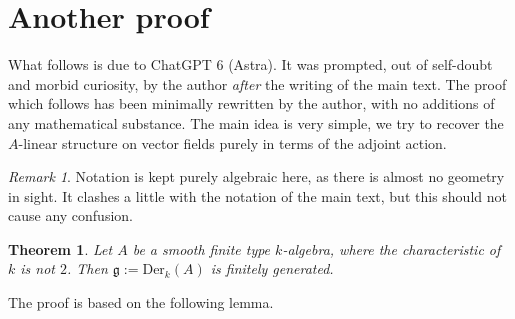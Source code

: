 \documentclass[12pt, oneside]{amsart}       %
\newtheorem{theorem}{Theorem}[section]
\theoremstyle{remark}
\newtheorem*{remark}{Remark}
\newcommand{\g}{\mathfrak{g}}
\begin{document}
\appendix

\section{Another proof}

What follows is due to ChatGPT 6 (Astra). It was prompted, out of self-doubt and morbid curiosity, by the author \emph{after} the writing of the main text. The proof which follows has been minimally rewritten by the author, with no additions of any mathematical substance. The main idea is very simple, we try to recover the $A$-linear structure on vector fields purely in terms of the adjoint action.   

\begin{remark} Notation is kept purely algebraic here, as there is almost no geometry in sight. It clashes a little with the notation of the main text, but this should not cause any confusion.\end{remark} 

\begin{theorem}\label{main-appendix}Let $A$ be a smooth finite type $k$-algebra, where the characteristic of $k$ is not $2$. Then $\g:=\mathrm{Der}_k(A)$ is finitely generated.\end{theorem}

The proof is based on the following lemma.
\end{document}
